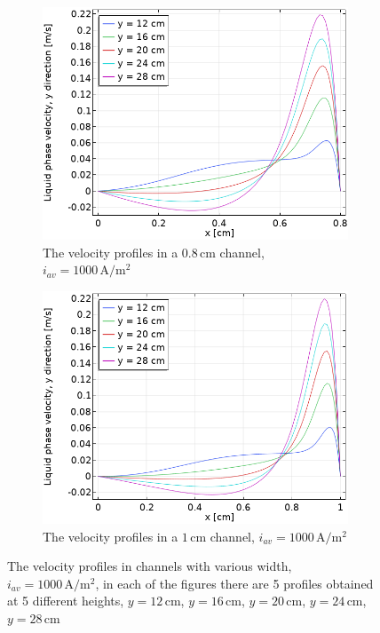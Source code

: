 \begin{figure}
\begin{subfigure}{.5\textwidth}
  \centering
  \includegraphics[width=1\linewidth]{velocityprofilenosaff8mm1000A.png}
  \caption{The velocity profiles in a $0.8 \,\mathrm{cm}$ channel, $i_{av}=1000 \, \mathrm{A/m^2}$}
\end{subfigure}%
\begin{subfigure}{.5\textwidth}
  \centering
  \includegraphics[width=1\linewidth]{velocityprofilenosaff1cm1000A.png}
  \caption{The velocity profiles in a $1 \,\mathrm{cm}$ channel, $i_{av}=1000 \, \mathrm{A/m^2}$}
\end{subfigure}
\caption{The velocity profiles in channels with various width, $i_{av}=1000 \, \mathrm{A/m^2}$, in each of the figures there are 5 profiles obtained at 5 different heights, $y = 12 \, \mathrm{cm}$, $y = 16 \, \mathrm{cm}$, $y = 20 \, \mathrm{cm}$, $y = 24 \, \mathrm{cm}$, $y = 28 \, \mathrm{cm}$}
\label{velocitygapwidthcomparison}
\end{figure}

